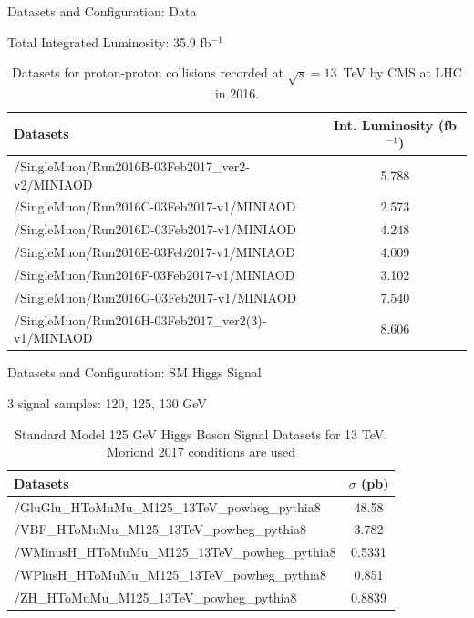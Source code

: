 \documentclass[pdf, 9pt]{beamer}
\begin{document}
  \begin{frame}{Datasets and Configuration: Data}
    \begin{center}Total Integrated Luminosity: 35.9 fb$^{-1}$\end{center}
    \begin{table}[htb]
    \caption{Datasets for proton-proton collisions recorded at $\sqrt{s}=13$~TeV by CMS at LHC in 2016.}
    \label{table:higgs_data_collisiondatasets}
    \begin{center}
        \begin{tabular}{ l  c}
            \hline
            Datasets & Int. Luminosity (fb$^{-1}$)\\
            \hline
            {/SingleMuon/Run2016B-03Feb2017\_ver2-v2/MINIAOD} & 5.788\\
            {/SingleMuon/Run2016C-03Feb2017-v1/MINIAOD} & 2.573\\
            {/SingleMuon/Run2016D-03Feb2017-v1/MINIAOD} & 4.248\\
            {/SingleMuon/Run2016E-03Feb2017-v1/MINIAOD} & 4.009\\
            {/SingleMuon/Run2016F-03Feb2017-v1/MINIAOD} & 3.102\\
            {/SingleMuon/Run2016G-03Feb2017-v1/MINIAOD} & 7.540\\
            {/SingleMuon/Run2016H-03Feb2017\_ver2(3)-v1/MINIAOD} & 8.606\\
            \hline
        \end{tabular}
    \end{center}
    \end{table}
  \end{frame}

  \begin{frame}{Datasets and Configuration: SM Higgs Signal}
    \begin{table}[htb]
    \begin{center}3 signal samples: 120, 125, 130 GeV\end{center}
    \caption{Standard Model 125 GeV Higgs Boson Signal Datasets for 13 TeV. Moriond 2017 conditions are used}
    \label{table:higgs_data_signaldatasets}
    \begin{center}
        \begin{tabular}{ l  c}
            \hline
            Datasets & $\sigma$ (pb)\\
            \hline
            {/GluGlu\_HToMuMu\_M125\_13TeV\_powheg\_pythia8} & 48.58\\
            {/VBF\_HToMuMu\_M125\_13TeV\_powheg\_pythia8} & 3.782\\
            {/WMinusH\_HToMuMu\_M125\_13TeV\_powheg\_pythia8} & 0.5331\\
            {/WPlusH\_HToMuMu\_M125\_13TeV\_powheg\_pythia8} & 0.851\\
            {/ZH\_HToMuMu\_M125\_13TeV\_powheg\_pythia8} & 0.8839 \\
            \hline
        \end{tabular}
    \end{center}
\end{table}
  \end{frame}
\end{document}
